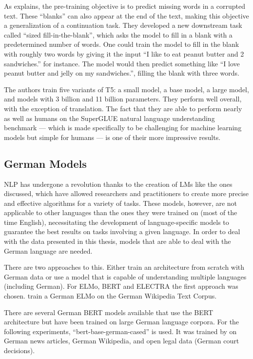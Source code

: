 As \citet{roberts_2020} explains, the pre-training objective is to predict missing words in a corrupted text. These ``blanks'' can also appear at the end of the text, making this objective a generalization of a continuation task. They developed a new downstream task called ``sized fill-in-the-blank'', which asks the model to fill in a blank with a predetermined number of words. One could train the model to fill in the blank with roughly two words by giving it the input ``I like to eat peanut butter and \underline{\hspace{2mm}}2\underline{\hspace{2mm}} sandwiches.'' for instance. The model would then predict something like ``I love peanut butter and jelly on my sandwiches.'', filling the blank with three words.

The authors train five variants of T5: a small model, a base model, a large model, and models with 3 billion and 11 billion parameters. They perform well overall, with the exception of translation. The fact that they are able to perform nearly as well as humans on the SuperGLUE natural language understanding benchmark — which is made specifically to be challenging for machine learning models but simple for humans — is one of their more impressive results.


\subsection{German Models} \label{german_models}

NLP has undergone a revolution thanks to the creation of LMs like the ones discussed, which have allowed researchers and practitioners to create more precise and effective algorithms for a variety of tasks. These models, however, are not applicable to other languages than the ones they were trained on (most of the time English), necessitating the development of language-specific models to guarantee the best results on tasks involving a given language. In order to deal with the data presented in this thesis, models that are able to deal with the German language are needed.

There are two approaches to this. Either train an architecture from scratch with German data or use a model that is capable of understanding multiple languages (including German). For ELMo, BERT and ELECTRA the first approach was chosen. \citet{GerElmo} train a German ELMo on the German Wikipedia Text Corpus.

There are several German BERT models available that use the BERT architecture but have been trained on large German language corpora. For the following experiments, ``bert-base-german-cased'' is used. It was trained by \citet{german_bert} on German news articles, German Wikipedia, and open legal data (German court decisions). 

